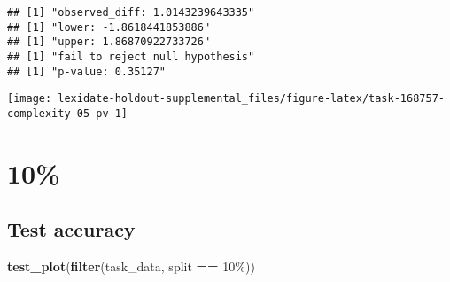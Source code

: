 \documentclass[
]{book}
\newenvironment{Shaded}{\begin{snugshade}}{\end{snugshade}}
\newcommand{\AttributeTok}[1]{\textcolor[rgb]{0.13,0.29,0.53}{#1}}
\newcommand{\DecValTok}[1]{\textcolor[rgb]{0.00,0.00,0.81}{#1}}
\newcommand{\FunctionTok}[1]{\textcolor[rgb]{0.13,0.29,0.53}{\textbf{#1}}}
\newcommand{\NormalTok}[1]{#1}
\newcommand{\OtherTok}[1]{\textcolor[rgb]{0.56,0.35,0.01}{#1}}
\newcommand{\SpecialCharTok}[1]{\textcolor[rgb]{0.81,0.36,0.00}{\textbf{#1}}}
\newcommand{\StringTok}[1]{\textcolor[rgb]{0.31,0.60,0.02}{#1}}
\begin{document}
\begin{Shaded}
\end{Shaded}

\begin{verbatim}
## [1] "observed_diff: 1.0143239643335"
## [1] "lower: -1.8618441853886"
## [1] "upper: 1.86870922733726"
## [1] "fail to reject null hypothesis"
## [1] "p-value: 0.35127"
\end{verbatim}

\texttt{[image: lexidate-holdout-supplemental\_files/figure-latex/task-168757-complexity-05-pv-1]}

\hypertarget{section-21}{%
\section{10\%}\label{section-21}}

\hypertarget{test-accuracy-21}{%
\subsection{Test accuracy}\label{test-accuracy-21}}

\begin{Shaded}
\begin{Highlighting}[]
\FunctionTok{test\_plot}\NormalTok{(}\FunctionTok{filter}\NormalTok{(task\_data, split }\SpecialCharTok{==} \StringTok{\textquotesingle{}10\%\textquotesingle{}}\NormalTok{))}
\end{Highlighting}
\end{Shaded}
\end{document}
